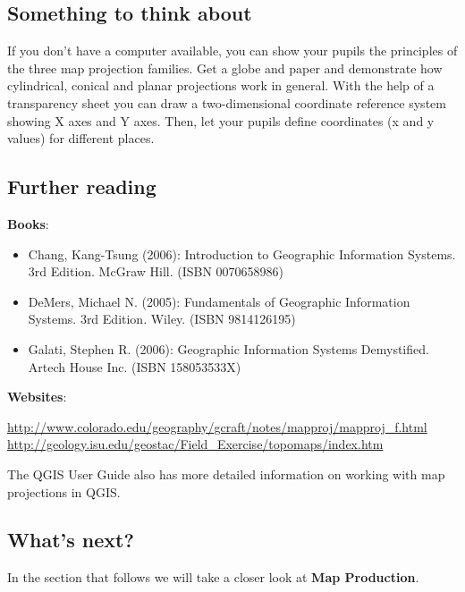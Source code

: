 \subsection{Something to think about}

If you don't have a computer available, you can show your pupils the
principles of the three map projection families. Get a globe and paper and
demonstrate how cylindrical, conical and planar projections work in general.
With the help of a transparency sheet you can draw a two-dimensional
coordinate reference system showing X axes and Y axes. Then, let your pupils
define coordinates (x and y values) for different places. 

\subsection{Further reading}

\textbf{Books}:

\begin{itemize}
\item Chang, Kang-Tsung (2006): Introduction to Geographic Information Systems. 3rd
Edition.  McGraw Hill. (ISBN 0070658986)
\item DeMers, Michael N. (2005): Fundamentals of Geographic Information Systems.
3rd Edition. Wiley. (ISBN 9814126195)
\item Galati, Stephen R. (2006): Geographic Information Systems Demystified. Artech
House Inc. (ISBN 158053533X)
\end{itemize}

\textbf{Websites}: 

\url{http://www.colorado.edu/geography/gcraft/notes/mapproj/mapproj_f.html}
\\
\url{http://geology.isu.edu/geostac/Field_Exercise/topomaps/index.htm}

The QGIS User Guide also has more detailed information on working with map
projections in QGIS.

\subsection{What's next?}

In the section that follows we will take a closer look at \textbf{Map Production}.


